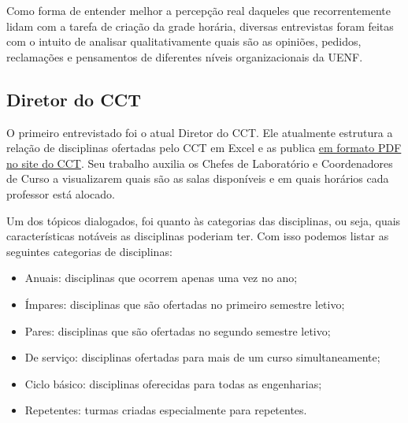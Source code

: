
    Como forma de entender melhor a percepção real daqueles que recorrentemente lidam com a tarefa de criação da grade horária, diversas entrevistas foram feitas com o intuito de analisar qualitativamente quais são as opiniões, pedidos, reclamações e pensamentos de diferentes níveis organizacionais da UENF.

    \subsection{Diretor do CCT} %


        O primeiro entrevistado foi o atual Diretor do CCT. Ele atualmente estrutura a relação de disciplinas ofertadas pelo CCT em Excel e as publica \href{https://uenf.br/cct/secretaria-academica/distribuicao-das-salas-de-aula-do-cct/}{em formato PDF no site do CCT}. Seu trabalho auxilia os Chefes de Laboratório e Coordenadores de Curso a visualizarem quais são as salas disponíveis e em quais horários cada professor está alocado.

        Um dos tópicos dialogados, foi quanto às categorias das disciplinas, ou seja, quais características notáveis as disciplinas poderiam ter. Com isso podemos listar as seguintes categorias de disciplinas:

        \begin{itemize}
            \item Anuais: disciplinas que ocorrem apenas uma vez no ano;
            \item Ímpares: disciplinas que são ofertadas no primeiro semestre letivo;
            \item Pares: disciplinas que são ofertadas no segundo semestre letivo;
            \item De serviço: disciplinas ofertadas para mais de um curso simultaneamente;
            \item Ciclo básico: disciplinas oferecidas para todas as engenharias;
            \item Repetentes: turmas criadas especialmente para repetentes.
        \end{itemize}


